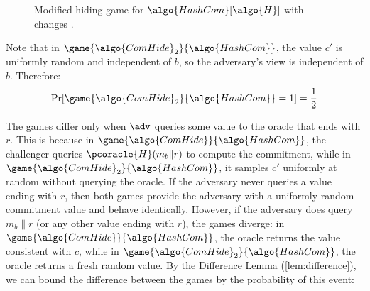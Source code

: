 \begin{mysolution}
\begin{figure}[h]
  \begin{center}
    \begin{tcolorbox}[width=10cm]
      \begin{pchstack}
        \pchspace
      \end{pchstack}
    \end{tcolorbox}
  \end{center}
  \caption{Modified hiding game for $\algo{HashCom}[\algo{H}]$ with changes .}
  \label{fig:hashcom-hiding-rom-modified}
\end{figure}

Note that in $\game{\algo{ComHide}_2}{\algo{HashCom}}$, the value $c'$ is uniformly random and independent of $b$, so the adversary's view is independent of $b$.
Therefore:
\[
\Pr[\game{\algo{ComHide}_2}{\algo{HashCom}} = 1] = \frac{1}{2}
\]

The games differ only when $\adv$ queries some value to the oracle that ends with $r$.
This is because in $\game{\algo{ComHide}}{\algo{HashCom}}$, the challenger queries $\pcoracle{H}(m_b \| r)$ to compute the commitment, while in $\game{\algo{ComHide}_2}{\algo{HashCom}}$, it samples $c'$ uniformly at random without querying the oracle.
If the adversary never queries a value ending with $r$, then both games provide the adversary with a uniformly random commitment value and behave identically.
However, if the adversary does query $m_b \| r$ (or any other value ending with $r$), the games diverge: in $\game{\algo{ComHide}}{\algo{HashCom}}$, the oracle returns the value consistent with $c$, while in $\game{\algo{ComHide}_2}{\algo{HashCom}}$, the oracle returns a fresh random value.
By the Difference Lemma (\autoref{lem:difference}), we can bound the difference between the games by the probability of this event:


\end{mysolution}
